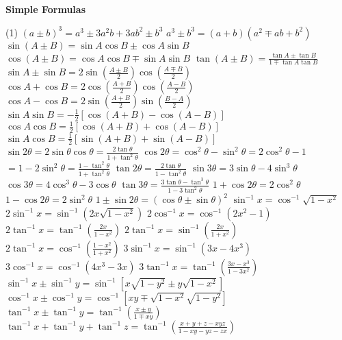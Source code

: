 \documentclass[10pt,a4paper,landscape]{article}
\begin{document}
\begin{multicols*}{3}
\begin{enumerate}
		\end{enumerate}
		
		
		
		\noindent \textbf{Simple Formulas}
		\vspace{-.15 cm}
		\begin{tasks}(1)
			\task $(a \pm b)^3 = a^3 \pm 3a^2b + 3ab^2 \pm b^3$
			\task $a^3 \pm b^3 = (a+b)(a^2 \mp ab + b^2)$
			\task $\sin(A \pm B) = \sin A \cos B \pm \cos A \sin B$
			\task $\cos(A \pm B) = \cos A \cos B \mp \sin A \sin B$
			\task $\tan(A \pm B) = \frac{\tan A \pm \tan B}{1 \mp \tan A \tan B}$
			\task $\sin A \pm \sin B = 2\sin\left(\frac{A \pm B}{2}\right)\cos\left(\frac{A \mp B}{2}\right)$
			\task $\cos A + \cos B = 2\cos\left(\frac{A+B}{2}\right)\cos\left(\frac{A-B}{2}\right)$
			\task $\cos A - \cos B = 2\sin\left(\frac{A+B}{2}\right)\sin\left(\frac{B - A}{2}\right)$
			\task $\sin A \sin B = -\frac{1}{2}[\cos(A+B) - \cos(A-B)]$
			\task $\cos A \cos B = \frac{1}{2}[\cos(A+B) + \cos(A-B)]$
			\task $\sin A \cos B = \frac{1}{2}[\sin(A+B) + \sin(A-B)]$
			\task $\sin 2\theta = 2\sin\theta\cos\theta = \frac{2\tan\theta}{1+\tan^2\theta}$
			\task $\cos 2\theta = \cos^2\theta - \sin^2\theta = 2\cos^2\theta - 1 $\\$= 1 - 2\sin^2\theta = \frac{1-\tan^2\theta}{1+\tan^2\theta}$
			\task $\tan 2\theta = \frac{2\tan\theta}{1-\tan^2\theta}$
			\task $\sin 3\theta = 3\sin\theta - 4\sin^3\theta$
			\task $\cos 3\theta = 4\cos^3\theta - 3\cos\theta$
			\task $\tan 3\theta = \frac{3\tan\theta - \tan^3\theta}{1-3\tan^2\theta}$
			\task $1 + \cos 2\theta = 2\cos^2\theta$
			\task $1 - \cos 2\theta = 2\sin^2\theta$
			\task $1 \pm \sin 2\theta = (\cos\theta \pm \sin\theta)^2$
			\task $\sin^{-1} x = \cos^{-1} \sqrt{1-x^2}$
			\task $2\sin^{-1} x = \sin^{-1}(2x\sqrt{1-x^2})$
			\task $2\cos^{-1} x = \cos^{-1}(2x^2 - 1)$
			\task $2\tan^{-1} x = \tan^{-1}\left(\frac{2x}{1-x^2}\right)$
			\task $2\tan^{-1} x = \sin^{-1}\left(\frac{2x}{1+x^2}\right)$
			\task $2\tan^{-1} x = \cos^{-1}\left(\frac{1-x^2}{1+x^2}\right)$
			\task $3\sin^{-1} x = \sin^{-1}(3x - 4x^3)$
			\task $3\cos^{-1} x = \cos^{-1}(4x^3 - 3x)$
			\task $3\tan^{-1} x = \tan^{-1}\left(\frac{3x-x^3}{1-3x^2}\right)$
			\task $\sin^{-1} x \pm \sin^{-1} y = \sin^{-1}\left[x\sqrt{1-y^2} \pm y\sqrt{1-x^2}\right]$
			\task $\cos^{-1} x \pm \cos^{-1} y = \cos^{-1}\left[xy \mp \sqrt{1-x^2}\sqrt{1-y^2}\right]$
			\task $\tan^{-1} x \pm \tan^{-1} y = \tan^{-1}\left(\frac{x \pm y}{1 \mp xy}\right)$
			\task $\tan^{-1} x + \tan^{-1} y + \tan^{-1} z = \tan^{-1}\left(\frac{x+y+z-xyz}{1-xy-yz-zx}\right)$
		\end{tasks}
		

\end{multicols*}
\end{document}
